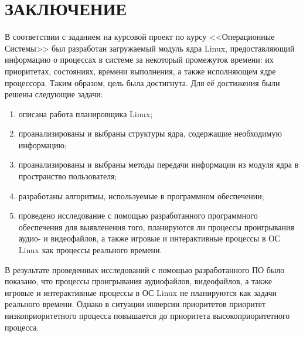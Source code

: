 \chapter*{ЗАКЛЮЧЕНИЕ}

В соответствии с заданием на курсовой проект по курсу <<Операционные Системы>> был разработан загружаемый модуль ядра Linux, предоставляющий информацию о процессах в системе за некоторый промежуток времени: их приоритетах, состояниях, времени выполнения, а также исполняющем ядре процессора. Таким образом, цель была достигнута. Для её достижения были решены следующие задачи:

\begin{enumerate}
\item описана работа планировщика Linux;
\item проанализированы и выбраны структуры ядра, содержащие необходимую информацию;
\item проанализированы и выбраны методы передачи информации из модуля ядра в пространство пользователя;
\item разработаны алгоритмы, используемые в программном обеспечении;
\item проведено исследование с помощью разработанного программного обеспечения для выявленения того, планируются ли процессы проигрывания аудио- и видеофайлов, а также игровые и интерактивные процессы в ОС Linux как процессы реального времени.
\end{enumerate}

В результате проведенных исследований с помощью разработанного ПО было показано, что процессы проигрывания аудиофайлов, видеофайлов, а также игровые и интерактивные процессы в ОС Linux не планируются как задачи реального времени. Однако в ситуации инверсии приоритетов приоритет низкоприоритетного процесса повышается до приоритета высокоприоритетного процесса. 
